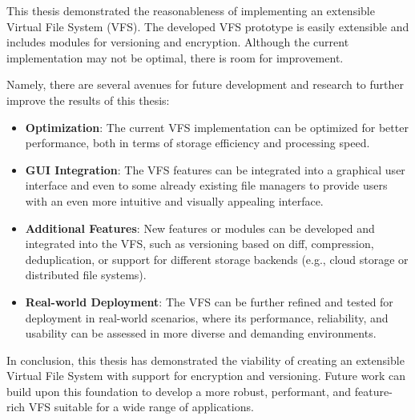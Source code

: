 

This thesis demonstrated the reasonableness of implementing an extensible Virtual File System (VFS).
The developed VFS prototype is easily extensible and includes modules for versioning and encryption.
Although the current implementation may not be optimal, there is room for improvement.



Namely, there are several avenues for future development and research to further improve the results of this thesis:

\begin{itemize}
    \item \textbf{Optimization}: The current VFS implementation can be optimized for better performance, both in terms of storage efficiency and processing speed.
    \item \textbf{GUI Integration}: The VFS features can be integrated into a graphical user interface and even to some already existing file managers to provide users with an even more intuitive and visually appealing interface.
    \item \textbf{Additional Features}: New features or modules can be developed and integrated into the VFS, such as versioning based on diff, compression, deduplication, or support for different storage backends (e.g., cloud storage or distributed file systems).
    \item \textbf{Real-world Deployment}: The VFS can be further refined and tested for deployment in real-world scenarios, where its performance, reliability, and usability can be assessed in more diverse and demanding environments.
\end{itemize}

In conclusion, this thesis has demonstrated the viability of creating an extensible Virtual File System with support for encryption and versioning.
Future work can build upon this foundation to develop a more robust, performant, and feature-rich VFS suitable for a wide range of applications.